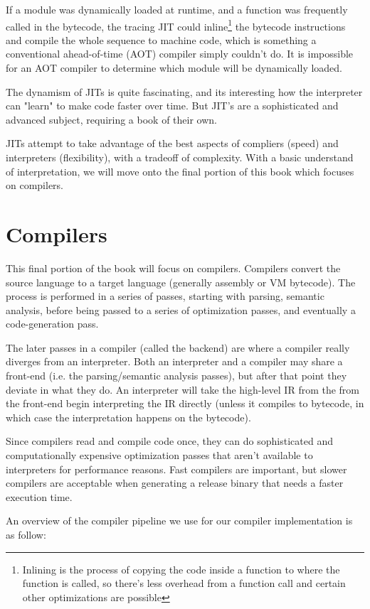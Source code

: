 \documentclass{book}
\newcommand{\sectionNewpage}{}
\let\SOriginalthesubsection\thesubsection
\newcommand{\Ssection}[2]{\section[#1]{#2}\let\thesubsection\SOriginalthesubsection}
\newcommand{\NoteBox}[1]{\footnote{#1}}
\newcommand{\NoteContent}[1]{#1}
\renewcommand{\Ssection}[2]{\chapter[#1]{#2}}
\begin{document}
If a module was dynamically loaded at runtime, and a function was
frequently called in the bytecode, the tracing JIT could
inline\NoteBox{\NoteContent{Inlining is the process of copying the code inside a function
to where the function is called, so there{'}s less overhead from a function
call and certain other optimizations are possible}} the bytecode
instructions and compile the whole sequence to
machine code, which is something a conventional ahead{-}of{-}time (AOT)
compiler simply couldn{'}t do. It is impossible for an AOT compiler to
determine which module will be dynamically loaded.

The dynamism of JITs is quite fascinating, and its interesting how the
interpreter can "learn" to make code faster over time. But JIT{'}s are a
sophisticated and advanced subject, requiring a book of their own.

JITs attempt to take advantage of the best aspects of compliers (speed)
and interpreters (flexibility), with a tradeoff of complexity. With
a basic understand of interpretation, we will move onto the final portion
of this book which focuses on compilers.

\sectionNewpage

\Ssection{Compilers}{Compilers}\label{t:x28part_x22Compilersx22x29}

This final portion of the book will focus on compilers. Compilers convert the
source language to a target language (generally assembly or VM bytecode).
The process is performed in a series of passes, starting with parsing,
semantic analysis, before being passed to a series of optimization passes,
and eventually a code{-}generation pass.

The later passes in a compiler (called the backend) are where a compiler really
diverges from an interpreter. Both an interpreter and a compiler may share a
front{-}end (i.e. the parsing/semantic analysis passes), but after that
point they deviate in what they do. An interpreter will take the
high{-}level IR from the from the front{-}end begin interpreting the IR
directly (unless it compiles to bytecode, in which case the interpretation
happens on the bytecode).

Since compilers read and compile code once, they can do sophisticated and
computationally expensive optimization passes that aren{'}t available to
interpreters for performance reasons. Fast compilers are important, but
slower compilers are acceptable when generating a release binary that
needs a faster execution time.

An overview of the compiler pipeline we use for our compiler
implementation is as follow:
\end{document}
